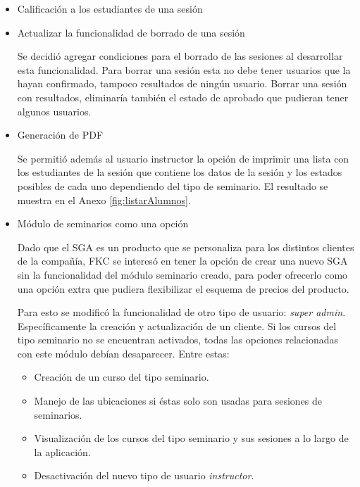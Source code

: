 \begin{itemize}

\item Calificación a los estudiantes de una sesión


\item Actualizar la funcionalidad de borrado de una sesión

Se decidió agregar condiciones para el borrado de las sesiones al desarrollar esta funcionalidad. Para borrar una sesión esta no debe tener usuarios que la hayan confirmado, tampoco resultados de ningún usuario. Borrar una sesión con resultados, eliminaría también el estado de aprobado que pudieran tener algunos usuarios.

\item Generación de PDF

Se permitió además al usuario instructor la opción de imprimir una lista con los estudiantes de la sesión que contiene los datos de la sesión y los estados posibles de cada uno dependiendo del tipo de seminario. El resultado se muestra en el Anexo \ref{fig:listarAlumnos}.


\item Módulo de seminarios como una opción

Dado que el SGA es un producto que se personaliza para los distintos clientes de la compañía, FKC se interesó en tener la opción de crear una nuevo SGA sin la funcionalidad del módulo seminario creado, para poder ofrecerlo como una opción extra que pudiera flexibilizar el esquema de precios del producto.

Para esto se modificó la funcionalidad de otro tipo de usuario: \emph{super admin}. Específicamente la creación y actualización de un cliente. Si los cursos del tipo seminario no se encuentran activados, todas las opciones relacionadas con este módulo debían desaparecer. Entre estas:

\begin{itemize}
	\item Creación de un curso del tipo seminario.
	\item Manejo de las ubicaciones si éstas solo son usadas para sesiones de seminarios.
	\item Visualización de los cursos del tipo seminario y sus sesiones a lo largo de la aplicación.
	\item Desactivación del nuevo tipo de usuario \emph{instructor}.
\end{itemize}

\end{itemize}


